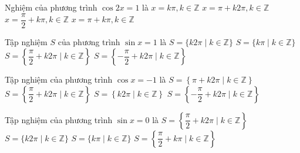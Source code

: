 \begin{ex}%
	Nghiệm của phương trình $\cos 2x = 1$ là
	\choice
	{\True $x=k\pi, k \in \mathbb{Z}$}
	{$x=\pi + k2\pi, k \in \mathbb{Z}$}
	{$x=\dfrac{\pi}
		{2} + k\pi, k \in \mathbb{Z}$}
	{$x=\pi + k\pi, k \in \mathbb{Z}$}
\end{ex}

\begin{ex}%
	Tập nghiệm $S$ của phương trình $\sin x = 1$ là
	\choice
	{$S=\{k2\pi\mid k \in \mathbb{Z}\}$}
	{$S=\{k\pi\mid k \in \mathbb{Z}\}$}
	{\True $S=\left\{\dfrac{\pi}{2}+k2\pi\mid k \in \mathbb{Z}\right\}$}
	{$S=\left\{-\dfrac{\pi}{2}+k2\pi\mid k \in \mathbb{Z}\right\}$}
\end{ex}

\begin{ex}%
	Tập nghiệm của phương trình $\cos x=-1$ là
	\choice
	{\True $S=\left\lbrace \pi+k 2 \pi \mid k \in\mathbb{Z} \right\rbrace $}
	{$S=\left\lbrace \dfrac{\pi}{2}+k 2 \pi \mid k \in\mathbb{Z}\right\rbrace $}
	{$S=\left\lbrace k 2 \pi \mid k \in\mathbb{Z}\right\rbrace $}
	{$S=\left\lbrace -\dfrac{\pi}{2}+k 2 \pi \mid k \in\mathbb{Z}\right\rbrace $}
\end{ex}

\begin{ex}%
	Tập nghiệm của phương trình $\sin x = 0$ là
	\choice
	{$S=\left\{\dfrac{\pi}{2}+k2\pi \mid k\in\mathbb{Z}\right\}$}
	{$S=\{ k2\pi \mid k \in \mathbb{Z}\}$}
	{\True $S=\{k\pi \mid k\in\mathbb{Z}\}$}
	{$S=\left\{\dfrac{\pi}{2}+k\pi \mid k\in\mathbb{Z}\right\}$}
\end{ex}

